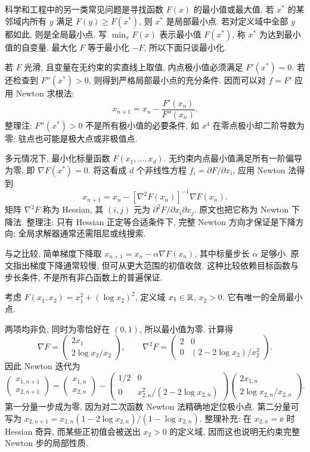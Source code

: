 
科学和工程中的另一类常见问题是寻找函数 $F(x)$ 的最小值或最大值. 若 $x^*$ 的某邻域内所有 $y$ 满足 $F(y)\geq F(x^*)$, 则 $x^*$ 是局部最小点. 若对定义域中全部 $y$ 都如此, 则是全局最小点. 写 $\min_xF(x)$ 表示最小值 $F(x^*)$, 称 $x^*$ 为达到最小值的自变量. 最大化 $F$ 等于最小化 $-F$, 所以下面只谈最小化.

若 $F$ 光滑, 且变量在无约束的实直线上取值, 内点极小值必须满足 $F'(x^*)=0$. 若还检查到 $F''(x^*)>0$, 则得到严格局部最小点的充分条件. 因而可以对 $f=F'$ 应用 Newton 求根法:
\[
x_{n+1}=x_n-\frac{F'(x_n)}{F''(x_n)}.
\]
整理注: $F''(x^*)>0$ 不是所有极小值的必要条件, 如 $x^4$ 在零点极小却二阶导数为零; 驻点也可能是极大点或非极值点.

多元情况下, 最小化标量函数 $F(x_1,\ldots,x_d)$. 无约束内点最小值满足所有一阶偏导为零, 即 $\nabla F(x^*)=0$. 将这看成 $d$ 个非线性方程 $f_i=\partial F/\partial x_i$, 应用 Newton 法得到
\[
x_{n+1}=x_n-[\nabla^2F(x_n)]^{-1}\nabla F(x_n).
\]
矩阵 $\nabla^2F$ 称为 Hessian, 其 $(i,j)$ 元为 $\partial^2F/\partial x_i\partial x_j$. 原文也把它称为 Newton 下降法. 整理注: 只有 Hessian 正定等合适条件下, 完整 Newton 方向才保证是下降方向; 全局求解器通常还需阻尼或线搜索.

与之比较, 简单梯度下降取 $x_{n+1}=x_n-\alpha\nabla F(x_n)$, 其中标量步长 $\alpha$ 足够小. 原文指出梯度下降通常较慢, 但可从更大范围的初值收敛. 这种比较依赖目标函数与步长条件, 不是所有非凸函数上的普遍保证.

\begin{example}\label{ex:log-optimization}
考虑 $F(x_1,x_2)=x_1^2+(\log x_2)^2$, 定义域 $x_1\in\mathbb R$, $x_2>0$. 它有唯一的全局最小点.
\end{example}
\begin{solution}
两项均非负, 同时为零恰好在 $(0,1)$, 所以最小值为零. 计算得
\[
\nabla F=\begin{pmatrix}2x_1\\2\log x_2/x_2\end{pmatrix},\qquad
\nabla^2F=\begin{pmatrix}2&0\\0&(2-2\log x_2)/x_2^2\end{pmatrix}.
\]
因此 Newton 迭代为
\[
\begin{pmatrix}x_{1,n+1}\\x_{2,n+1}\end{pmatrix}
=\begin{pmatrix}x_{1,n}\\x_{2,n}\end{pmatrix}
-\begin{pmatrix}1/2&0\\0&x_{2,n}^2/(2-2\log x_{2,n})\end{pmatrix}
\begin{pmatrix}2x_{1,n}\\2\log x_{2,n}/x_{2,n}\end{pmatrix}.
\]
第一分量一步成为零, 因为对二次函数 Newton 法精确地定位极小点. 第二分量可写为 $x_{2,n+1}=x_{2,n}(1-2\log x_{2,n})/(1-\log x_{2,n})$. 整理补充: 在 $x_{2,n}=\ee$ 时 Hessian 奇异, 而某些正初值会被送出 $x_2>0$ 的定义域, 因而这也说明无约束完整 Newton 步的局部性质.
\end{solution}
